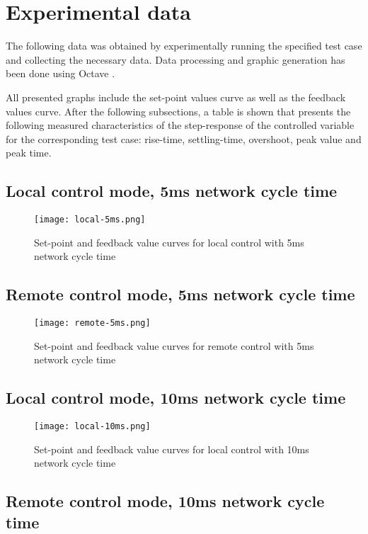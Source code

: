 \section{Experimental data}
The following data was obtained by experimentally running the specified test case and collecting the necessary data.
Data processing and graphic generation has been done using Octave \cite{sw:octave}.

All presented graphs include the set-point values curve as well as the feedback values curve.
After the following subsections, a table is shown that presents the following measured characteristics of the step-response of the controlled variable for the corresponding test case: rise-time, settling-time, overshoot, peak value and peak time.

\subsection{Local control mode, 5ms network cycle time}

\begin{figure}[!h]
	\centering
	\texttt{[image: local-5ms.png]}
	\caption{Set-point and feedback value curves for local control with 5ms network cycle time}
	\label{fig:local-5ms}
\end{figure}

\subsection{Remote control mode, 5ms network cycle time}

\begin{figure}[!h]
	\centering
	\texttt{[image: remote-5ms.png]}
	\caption{Set-point and feedback value curves for remote control with 5ms network cycle time}
	\label{fig:remote-5ms}
\end{figure}

\subsection{Local control mode, 10ms network cycle time}

\begin{figure}[!h]
	\centering
	\texttt{[image: local-10ms.png]}
	\caption{Set-point and feedback value curves for local control with 10ms network cycle time}
	\label{fig:local-10ms}
\end{figure}

\subsection{Remote control mode, 10ms network cycle time}

